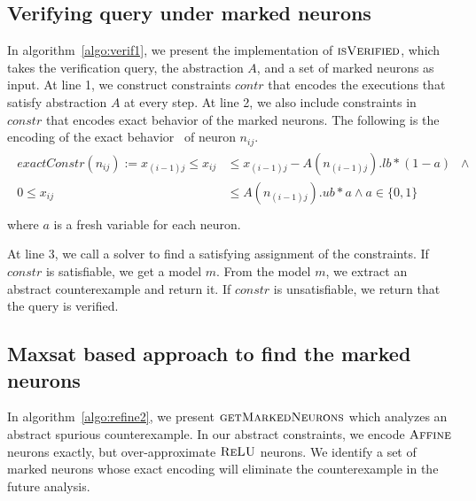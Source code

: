 





\subsection{Verifying query under marked neurons}
\label{sec:verif}
In algorithm~\ref{algo:verif1}, we present the implementation of 
$\textsc{isVerified}$, which takes the verification query, the \deeppoly{} abstraction $A$,
and a set of marked neurons as input.
At line 1, we construct constraints $contr$ that encodes the executions that satisfy abstraction
$A$ at every step.
At line 2, we also include constraints in $constr$ that encodes exact behavior of the marked
neurons. The following is the encoding of the exact behavior~\cite{tjeng2017evaluating} of neuron $n_{ij}$.
\begin{align}
    \label{eq:reluexact}
    \begin{split}
      exactConstr(n_{ij}) := x_{(i-1)j} \leq x_{ij} &\leq x_{(i-1)j} - A(n_{(i-1)j}).lb*(1-a) \;\;\land  \\
        0 \leq x_{ij} &\leq A(n_{(i-1)j}).ub*a \land a \in \{0,1\} \\ 
    \end{split}
\end{align}
where $a$ is a fresh variable for each neuron.

At line 3, we call a solver to find a satisfying assignment of the constraints.
If $constr$ is satisfiable, we get a model $m$.
From the model $m$, we extract an abstract counterexample and return it.
If $constr$ is unsatisfiable, we return that the query is verified.




\subsection{Maxsat based approach to find the marked neurons}
\label{sec:markedneurons}
In algorithm~\ref{algo:refine2}, we present $\textsc{getMarkedNeurons}$
which analyzes an abstract spurious counterexample.
In our abstract constraints, we encode $\textsc{Affine}${} neurons exactly, but
over-approximate $\textsc{ReLU}${} neurons.
We identify a set of
marked neurons whose exact encoding will eliminate the counterexample
in the future analysis.
%

